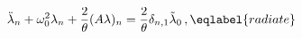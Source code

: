 \begin{equation}
\ddot\lambda_n + \omega_0^2\lambda_n + \frac2\theta (A\lambda)_n =
\frac2\theta\delta_{n,1} \tilde\lambda_0 \,, 
\eqlabel{radiate}
\end{equation}

